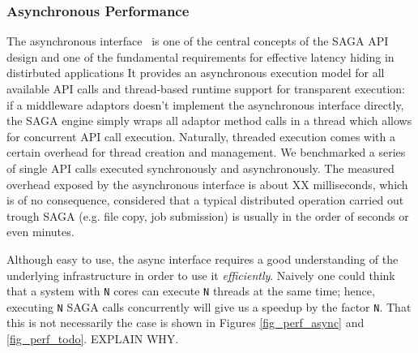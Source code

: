 \subsubsection{Asynchronous Performance}\label{perf_async}
The asynchronous interface~\cite{saga-spec} is one of the central concepts of the SAGA API design and one of the fundamental requirements for effective latency hiding in distirbuted applications It provides an asynchronous execution model for all available API calls and thread-based runtime support for transparent execution: if a middleware adaptors doesn't implement the asynchronous interface directly, the SAGA engine simply wraps all adaptor method calls in a thread which allows for concurrent API call execution.
Naturally, threaded execution comes with a certain overhead for thread creation and management. We benchmarked a series of single API calls executed synchronously and asynchronously. The measured overhead exposed by the asynchronous interface is about XX milliseconds, which is of no consequence, considered that a typical distributed operation carried out trough SAGA (e.g. file copy, job submission) is usually in the order of seconds or even minutes. 

Although easy to use, the async interface requires a good understanding of the underlying infrastructure in order to use it \textit{efficiently}. Naively one could think that a system with \texttt{N} cores can execute \texttt{N} threads at the same time; hence, executing \texttt{N} SAGA calls concurrently will give us a speedup by the factor \texttt{N}. That this is not necessarily the case is shown in Figures \ref{fig_perf_async} and \ref{fig_perf_todo}. EXPLAIN WHY.


